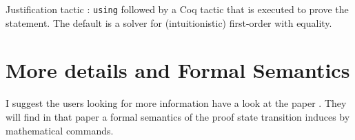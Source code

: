 Justification tactic : {\texttt{using}} followed by a Coq tactic that
is executed to prove the statement. The default is a solver for
(intuitionistic) first-{}order with equality.

\section{More details and Formal Semantics}

I suggest the users looking for more information have a look at the
paper \cite{corbineau08types}. They will find in that paper a formal
semantics of the proof state transition induces by mathematical
commands.
